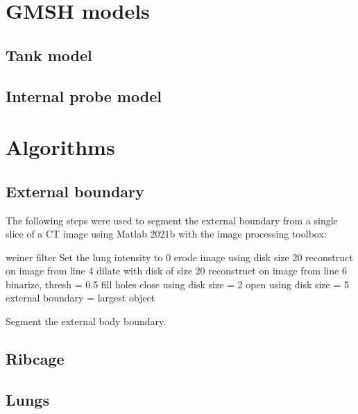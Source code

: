 \begin{appendices} 

\chapter{GMSH models} \label{app:geo_stuff}
\section{Tank model}
\section{Internal probe model}

\chapter{Algorithms} \label{app:appendix-algos}

\section{External boundary}
The following steps were used to segment the external boundary 
from a single slice 
of a CT image using Matlab 2021b  
with the image processing toolbox:

\begin{algorithm}[H]
	\SetAlgoLined
		weiner filter\;
		Set the lung intensity to 0\;
		erode image using disk size 20\;
		reconstruct on image from line 4\;
		dilate with disk of size 20\;
		reconstruct on image from line 6\;
		binarize, thresh = 0.5\;
		fill holes\;
		close using disk size = 2\;
		open using disk size = 5\;
		external boundary = largest object\;
	\caption{Segment the external body boundary.}
\end{algorithm}


\section{Ribcage}
\section{Lungs}
\end{appendices}